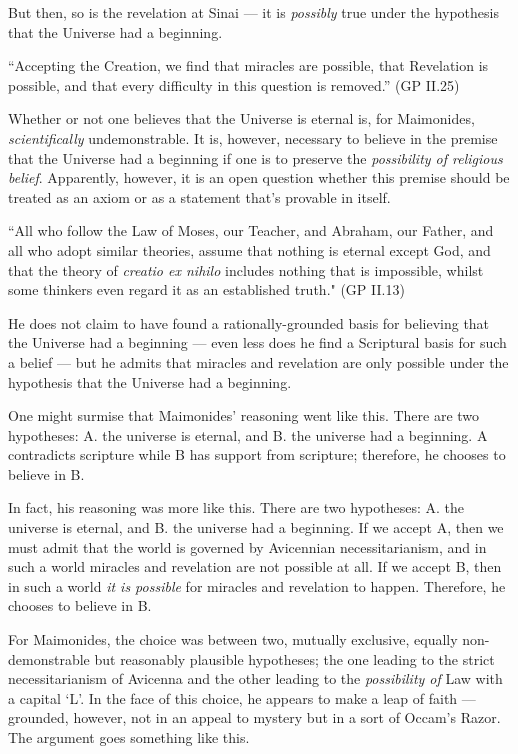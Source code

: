 \documentclass[12pt]{article}
\begin{document}
But then, so is the revelation at Sinai --- it is \emph{possibly} true under the hypothesis that the Universe had a beginning. 
\begin{displayquote}
``Accepting the Creation, we find that miracles are possible, that Revelation is possible, and that every difficulty in this question is removed.'' \hfill (GP II.25)
\end{displayquote}

Whether or not one believes that the Universe is eternal is, for Maimonides, \emph{scientifically} undemonstrable. It is, however, necessary to believe in the premise that the Universe had a beginning if one is to preserve the \emph{possibility of religious belief}. Apparently, however, it is an open question whether this premise should be treated as an axiom or as a statement that's provable in itself. 
\begin{displayquote}
``All who follow the Law of Moses, our Teacher, and Abraham, our Father, and all who adopt similar theories, assume that nothing is eternal except God, and that the theory of \emph{creatio ex nihilo} includes nothing that is impossible, whilst some thinkers even regard it as an established truth." \hfill (GP II.13)
\end{displayquote}

He does not claim to have found a rationally-grounded basis for believing that the Universe had a beginning --- even less does he find a Scriptural basis for such a belief --- but he admits that miracles and revelation are only possible under the hypothesis that the Universe had a beginning.

One might surmise that Maimonides' reasoning went like this. There are two hypotheses: A. the universe is eternal, and B. the universe had a beginning. A contradicts scripture while B has support from scripture; therefore, he chooses to believe in B.

In fact, his reasoning was more like this. There are two hypotheses: A. the universe is eternal, and B. the universe had a beginning. If we accept A, then we must admit that the world is governed by Avicennian necessitarianism, and in such a world miracles and revelation are not possible at all. If we accept B, then in such a world \emph{it is possible} for miracles and revelation to happen. Therefore, he chooses to believe in B.

For Maimonides, the choice was between two, mutually exclusive, equally non-demonstrable but reasonably plausible hypotheses; the one leading to the strict necessitarianism of Avicenna and the other leading to the \emph{possibility of} Law with a capital `L'. In the face of this choice, he appears to make a leap of faith --- grounded, however, not in an appeal to mystery but in a sort of Occam's Razor. The argument goes something like this.
\end{document}
